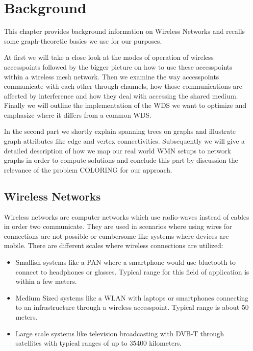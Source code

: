 \chapter{Background}
This chapter provides background information on Wireless Networks and recalls some graph-theoretic basics we use for our purposes.

At first we will take a close look at the modes of operation of wireless accesspoints followed by the bigger picture on how to use these accesspoints
within a wireless mesh network. Then we examine the way accesspoints communicate with each other through channels, how those communications are affected by interference and
how they deal with accessing the shared medium. Finally we will outline the implementation of the \ac{WDS} we want to optimize and emphasize where it differs from a common
\ac{WDS}.

In the second part we shortly explain spanning trees on graphs and illustrate graph attributes like edge and vertex connectivities.
Subsequently we will give a detailed description of how we map our real world \ac{WMN} setups to network graphs in order to compute solutions and conclude this part by
discussion the relevance of the problem COLORING for our approach.

\section{Wireless Networks}
  Wireless networks are computer networks which use radio-waves instead of cables in order two communicate.
  They are used in scenarios where using wires for connections are not possible or cumbersome like systems where devices are mobile.
  There are different scales where wireless connections are utilized:
    \begin{itemize}
      \item Smallish systems like a \ac{PAN} where a smartphone would use bluetooth to connect to headphones or glasses. Typical range for this field of
	application is within a few meters.
      \item Medium Sized systems like a \ac{WLAN} with laptops or smartphones connecting to an infrastructure through a wireless accesspoint.
	Typical range is about 50 meters.
      \item Large scale systems like television broadcasting with \ac{DVB-T} through satellites with typical ranges of up to 35400 kilometers.
    \end{itemize}
